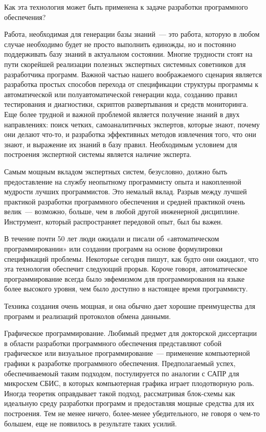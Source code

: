 Как эта технология может быть применена к задаче разработки программного
обеспечения?

Работа, необходимая для генерации базы знаний\ --- это работа, которую в любом
случае необходимо будет не просто выполнить единожды, но и постоянно
поддерживать базу знаний в актуальном состоянии. Многие трудности стоят на пути
скорейшей реализации полезных экспертных системных советников для разработчика
программ. Важной частью нашего воображаемого сценария является разработка
простых способов перехода от спецификации структуры программы к автоматической
или полуавтоматической генерации кода, созданию правил тестирования и
диагностики, скриптов развертывания и средств мониторинга. Еще более трудной и
важной проблемой является получение знаний в двух направлениях: поиск четких,
самоаналитичных экспертов, которые знают, почему они делают что-то, и разработка
эффективных методов извлечения того, что они знают, и выражение их знаний в базу
правил. Необходимым условием для построения экспертной системы является наличие
эксперта.

Самым мощным вкладом экспертных систем, безусловно, должно быть предоставление
на службу неопытному программисту опыта и накопленной мудрости лучших
программистов. Это немалый вклад. Разрыв между лучшей практикой разработки
программного обеспечения и средней практикой очень велик\ --- возможно, больше,
чем в любой другой инженерной дисциплине. Инструмент, который распространяет
передовой опыт, был бы важен.

В течение почти 50 лет люди ожидали и писали об «автоматическом
программировании» или создании программ на основе формулировки спецификаций
проблемы. Некоторые сегодня пишут, как будто они ожидают, что эта технология
обеспечит следующий прорыв. Короче говоря, автоматическое программирование
всегда было эвфемизмом для программирования на языке более высокого уровня, чем
было доступно в настоящее время программисту.

Техника создания  очень мощная, и она обычно дает хорошие
преимущества для программ  и реализаций протоколов
обмена данными. 

Графическое программирование. Любимый предмет для докторской диссертации в
области разработки программного обеспечения представляют собой графическое или
визуальное программирование\ --- применение компьютерной графики к разработке
программного обеспечения. Предполагаемый успех, обеспечиваемоый таким подходом,
постулируется по аналогии с САПР для микросхем СБИС, в которых компьютерная
графика играет плодотворную роль. Иногда теоретик оправдывает такой подход,
рассматривая блок-схемы как идеальную среду разработки программ и предоставляя
мощные средства для их построения. Тем не менее ничего, более-менее
убедительного, не говоря о чем-то большем, еще не появилось в результате таких
усилий.

